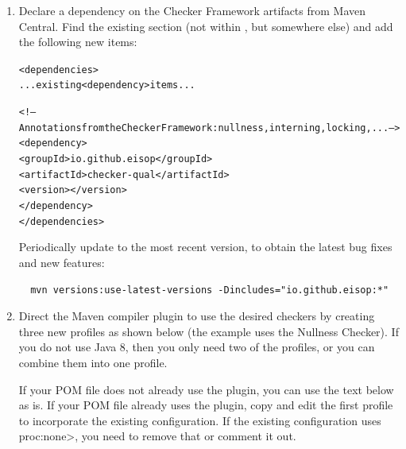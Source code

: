 \begin{enumerate}

\item Declare a dependency on the Checker Framework artifacts from
  Maven Central.  Find the
  existing  section (not within
  , but somewhere else) and add the following new
   items:

\begin{alltt}
  <dependencies>
    ... existing <dependency> items ...

    <!-- Annotations from the Checker Framework: nullness, interning, locking, ... -->
    <dependency>
      <groupId>io.github.eisop</groupId>
      <artifactId>checker-qual</artifactId>
      <version>\ReleaseVersion{}</version>
    </dependency>
  </dependencies>
\end{alltt}

Periodically update to the most recent version, to obtain the
latest bug fixes and new features:
\begin{Verbatim}
  mvn versions:use-latest-versions -Dincludes="io.github.eisop:*"
\end{Verbatim}

\item Direct the Maven compiler plugin to use the desired checkers by
  creating three new profiles as shown below (the example uses the Nullness
  Checker).  If you do not use Java 8, then you only need two of the
  profiles, or you can combine them into one profile.

  If your POM file does not already use the
   plugin, you can use the text below as is.
  If your POM file
  already uses the plugin, copy and edit the first profile to incorporate the
  existing configuration.
  If the existing configuration uses \<proc:none>, you need to remove that
  or comment it out.



\end{enumerate}
